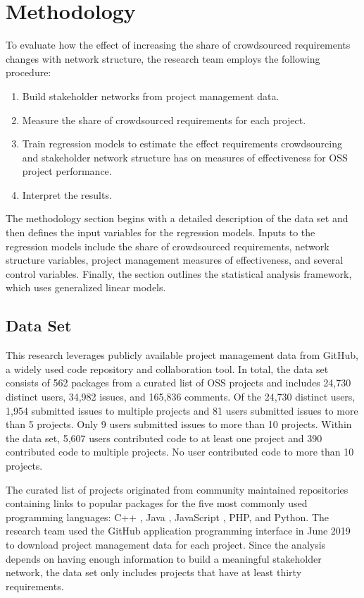 \section{Methodology}

To evaluate how the effect of increasing the share of crowdsourced requirements changes with network structure, the research team employs the following procedure:

\begin{enumerate}
    \item Build stakeholder networks from project management data.
    \item Measure the share of crowdsourced requirements for each project.
    \item Train regression models to estimate the effect requirements crowdsourcing and stakeholder network structure has on measures of effectiveness for OSS project performance.
    \item Interpret the results.
\end{enumerate}

The methodology section begins with a detailed description of the data set and then defines the input variables for the regression models. Inputs to the regression models include the share of crowdsourced requirements, network structure variables, project management measures of effectiveness, and several control variables. Finally, the section outlines the statistical analysis framework, which uses generalized linear models.

\subsection{Data Set}
\label{data_set_section}

This research leverages publicly available project management data from GitHub, a widely used code repository and collaboration tool. In total, the data set consists of 562 packages from a curated list of OSS projects and includes 24,730 distinct users, 34,982 issues, and 165,836 comments. Of the 24,730 distinct users, 1,954 submitted issues to multiple projects and 81 users submitted issues to more than 5 projects. Only 9 users submitted issues to more than 10 projects. Within the data set, 5,607 users contributed code to at least one project and 390 contributed code to multiple projects. No user contributed code to more than 10 projects.

The curated list of projects originated from community maintained repositories containing links to popular packages for the five most commonly used programming languages: C++ \cite{cpp}, Java \cite{java}, JavaScript \cite{javascript}, PHP\cite{php}, and Python\cite{python}. The research team used the GitHub application programming interface in June 2019 to download project management data for each project. Since the analysis depends on having enough information to build a meaningful stakeholder network, the data set only includes projects that have at least thirty requirements.

